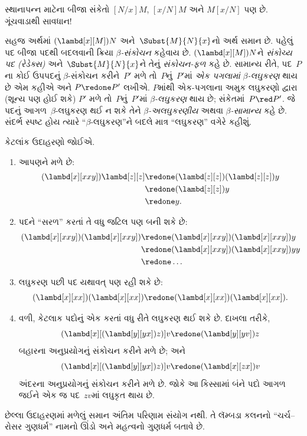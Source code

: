 \begin{digress}
સ્થાનાપન્ન માટેના બીજા સંકેતો $[N/x]M$, $[x/N]M$ અને
$M[x/N]$ પણ છે. ગૂંચવાડાથી સાવધાન!
\end{digress}

સહજ અર્થમાં $(\lambd[x][M])N$ અને~$\Subst{M}{N}{x}$નો અર્થ
સમાન છે. પહેલું પદ બીજા પદથી બદલવાની ક્રિયા
\emph{$\beta$-સંકોચન} કહેવાય છે. $(\lambd[x][M])N$ને
\emph{સંકોચ્ય પદ (રેડેક્સ)} અને~$\Subst{M}{N}{x}$ને તેનું
\emph{સંકોચન-ફળ} કહે છે. સામાન્ય રીતે, પદ~$P$ના કોઈ ઉપપદનું
$\beta$-સંકોચન કરીને~$P'$ મળે તો~$P$નું~$P'$માં
\emph{એક પગલામાં $\beta$-લઘુકરણ} થાય છે એમ કહીએ અને
$P \redone P'$ લખીએ. $P$માંથી એક-પગલાના અમુક લઘુકરણો દ્વારા
(શૂન્ય પણ હોઈ શકે) $P'$ મળે તો~$P$નું~$P'$માં
\emph{$\beta$-લઘુકરણ} થાય છે; સંકેતમાં~$P \red P'$.
જે પદનું આગળ~$\beta$-લઘુકરણ થઈ ન શકે તેને
\emph{$\beta$-અલઘુકરણીય} અથવા \emph{$\beta$-સામાન્ય}
કહે છે. સંદર્ભ સ્પષ્ટ હોય ત્યારે ``$\beta$-લઘુકરણ''ને બદલે
માત્ર ``લઘુકરણ'' વગેરે કહીશું.

કેટલાંક ઉદાહરણો જોઈએ.
\begin{enumerate}
\item આપણને મળે છે:
\begin{align*}
(\lambd[x][xxy]) \lambd[z][z] & \redone (\lambd[z][z])(\lambd[z][z]) y \\
& \redone (\lambd[z][z]) y \\
& \redone y.
\end{align*}
\item પદને ``સરળ'' કરતાં તે વધુ જટિલ પણ બની શકે છે:
\begin{align*}
(\lambd[x][xxy])(\lambd[x][xxy]) & \redone (\lambd[x][xxy])(\lambd[x][xxy])y \\
& \redone (\lambd[x][xxy])(\lambd[x][xxy])yy \\
& \redone \dots
\end{align*}
\item લઘુકરણ પછી પદ યથાવત્ પણ રહી શકે છે:
\[
(\lambd[x][xx])(\lambd[x][xx]) \redone (\lambd[x][xx])(\lambd[x][xx]).
\]
\item વળી, કેટલાક પદોનું એક કરતાં વધુ રીતે લઘુકરણ થઈ શકે છે.
  દાખલા તરીકે,
\[
(\lambd[x][(\lambd[y][yx]) z)] v \redone (\lambd[y][yv]) z
\]
બહારના અનુપ્રયોગનું સંકોચન કરીને મળે છે; અને
\[
(\lambd[x][(\lambd[y][yx]) z)] v \redone (\lambd[x][zx]) v
\]
અંદરના અનુપ્રયોગનું સંકોચન કરીને મળે છે. જોકે આ કિસ્સામાં
બંને પદો આગળ જઈને એક જ પદ~$zv$માં લઘુકૃત થાય છે.
\end{enumerate}

છેલ્લા ઉદાહરણમાં મળેલું સમાન અંતિમ પરિણામ સંયોગ નથી. તે
લૅમ્બડા કલનનો ``ચર્ચ--રોસર ગુણધર્મ'' નામનો ઊંડો અને મહત્વનો
ગુણધર્મ બતાવે છે.
\endgroup


